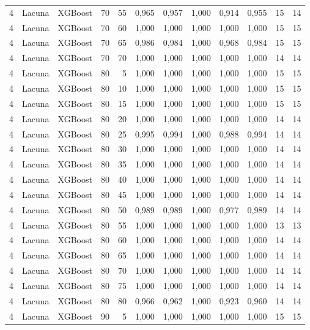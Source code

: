 \begin{longtable}{ccclrrrrrrrr}
4 & Lacuna & XGBoost & 70 & 55 & 0,965 & 0,957 & 1,000 & 0,914 & 0,955 & 15 & 14 \\
4 & Lacuna & XGBoost & 70 & 60 & 1,000 & 1,000 & 1,000 & 1,000 & 1,000 & 15 & 15 \\
4 & Lacuna & XGBoost & 70 & 65 & 0,986 & 0,984 & 1,000 & 0,968 & 0,984 & 15 & 15 \\
4 & Lacuna & XGBoost & 70 & 70 & 1,000 & 1,000 & 1,000 & 1,000 & 1,000 & 14 & 14 \\
4 & Lacuna & XGBoost & 80 & 5 & 1,000 & 1,000 & 1,000 & 1,000 & 1,000 & 15 & 15 \\
4 & Lacuna & XGBoost & 80 & 10 & 1,000 & 1,000 & 1,000 & 1,000 & 1,000 & 15 & 15 \\
4 & Lacuna & XGBoost & 80 & 15 & 1,000 & 1,000 & 1,000 & 1,000 & 1,000 & 15 & 15 \\
4 & Lacuna & XGBoost & 80 & 20 & 1,000 & 1,000 & 1,000 & 1,000 & 1,000 & 14 & 14 \\
4 & Lacuna & XGBoost & 80 & 25 & 0,995 & 0,994 & 1,000 & 0,988 & 0,994 & 14 & 14 \\
4 & Lacuna & XGBoost & 80 & 30 & 1,000 & 1,000 & 1,000 & 1,000 & 1,000 & 14 & 14 \\
4 & Lacuna & XGBoost & 80 & 35 & 1,000 & 1,000 & 1,000 & 1,000 & 1,000 & 14 & 14 \\
4 & Lacuna & XGBoost & 80 & 40 & 1,000 & 1,000 & 1,000 & 1,000 & 1,000 & 14 & 14 \\
4 & Lacuna & XGBoost & 80 & 45 & 1,000 & 1,000 & 1,000 & 1,000 & 1,000 & 14 & 14 \\
4 & Lacuna & XGBoost & 80 & 50 & 0,989 & 0,989 & 1,000 & 0,977 & 0,989 & 14 & 14 \\
4 & Lacuna & XGBoost & 80 & 55 & 1,000 & 1,000 & 1,000 & 1,000 & 1,000 & 13 & 13 \\
4 & Lacuna & XGBoost & 80 & 60 & 1,000 & 1,000 & 1,000 & 1,000 & 1,000 & 14 & 14 \\
4 & Lacuna & XGBoost & 80 & 65 & 1,000 & 1,000 & 1,000 & 1,000 & 1,000 & 14 & 14 \\
4 & Lacuna & XGBoost & 80 & 70 & 1,000 & 1,000 & 1,000 & 1,000 & 1,000 & 14 & 14 \\
4 & Lacuna & XGBoost & 80 & 75 & 1,000 & 1,000 & 1,000 & 1,000 & 1,000 & 14 & 14 \\
4 & Lacuna & XGBoost & 80 & 80 & 0,966 & 0,962 & 1,000 & 0,923 & 0,960 & 14 & 14 \\
4 & Lacuna & XGBoost & 90 & 5 & 1,000 & 1,000 & 1,000 & 1,000 & 1,000 & 15 & 15 \\

\end{longtable}
